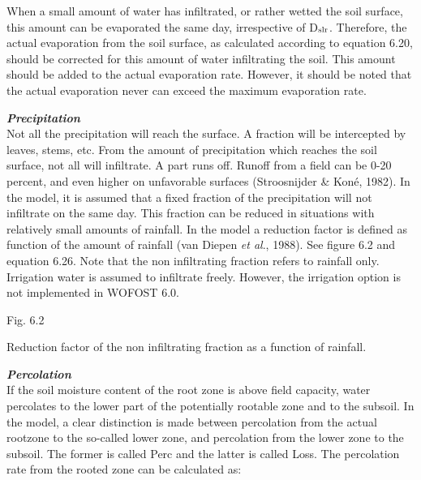 \documentclass[11pt]{article}
\newcommand{\FigDir}{.}
\begin{document}
\bigskip
\bigskip
When a small amount of water has infiltrated, or rather wetted the soil surface, this
amount can be evaporated the same day, irrespective of D$_{{\rm slr}}$. Therefore, the actual
evaporation from the soil surface, as calculated according to equation 6.20, should be
corrected for this amount of water infiltrating the soil. This amount should be added to
the actual evaporation rate. However, it should be noted that the actual evaporation never
can exceed the maximum evaporation rate.

\bigskip
\bigskip
{\it {\bf Precipitation}\/}\\
Not all the precipitation will reach the surface. A fraction will be intercepted by leaves,
stems, etc. From the amount of precipitation which reaches the soil surface, not all will
infiltrate. A part runs off. Runoff from a field can be 0-20 percent, and even higher on
unfavorable surfaces (Stroosnijder \& Kon\'{e}, 1982). In the model, it is assumed that a
fixed fraction of the precipitation will not infiltrate on the same day. This fraction can be
reduced in situations with relatively small amounts of rainfall. In the model a reduction
factor is defined as function of the amount of rainfall (van Diepen {\it et al\/}., 1988). See 
figure 6.2 and equation 6.26. Note that the non infiltrating fraction refers to rainfall only.
Irrigation water is assumed to infiltrate freely. However, the irrigation option is not
implemented in WOFOST 6.0.

\begin{figure}[htbp]
\begin{forcewidth}{11.06cm}
 \begin{center}\InputPS{\FigDir/RED.eps} \end{center}
\end{forcewidth}
\end{figure}

\bigskip
\bigskip
\bigskip
\bigskip
\bigskip
\bigskip
\bigskip
\bigskip
\bigskip
\bigskip
\bigskip
\bigskip
\bigskip
\bigskip
\bigskip
\bigskip
\bigskip
\bigskip
\bigskip
Fig. 6.2 
\testlastline

\begin{indenting}{2.54cm}
Reduction factor of the non infiltrating fraction as a function of rainfall.
\end{indenting}

\bigskip
\bigskip
{\bf {\it Percolation\/}}\\
If the soil moisture content of the root zone is above field capacity, water percolates to
the lower part of the potentially rootable zone and to the subsoil. In the model, a clear
distinction is made between percolation from the actual rootzone to the so-called lower
zone, and percolation from the lower zone to the subsoil. The former is called Perc and
the latter is called Loss. The percolation rate from the rooted zone can be calculated as:
\end{document}
